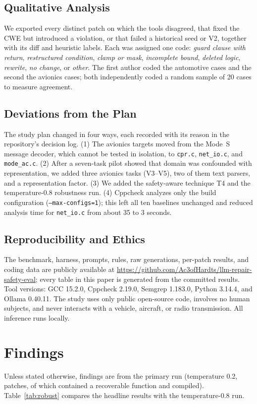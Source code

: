 \documentclass[12pt]{IEEEtran}
\begin{document}
\subsection{Qualitative Analysis}
We exported every distinct patch on which the tools disagreed, that fixed the CWE but introduced a violation, or that failed a historical seed or V2, together with its diff and heuristic labels. Each was assigned one code: \emph{guard clause with return}, \emph{restructured condition}, \emph{clamp or mask}, \emph{incomplete bound}, \emph{deleted logic}, \emph{rewrite}, \emph{no change}, or \emph{other}. The first author coded the automotive cases and the second the avionics cases; both independently coded a random sample of 20 cases to measure agreement.

\subsection{Deviations from the Plan}
The study plan changed in four ways, each recorded with its reason in the repository's decision log. (1) The avionics targets moved from the Mode~S message decoder, which cannot be tested in isolation, to \texttt{cpr.c}, \texttt{net\_io.c}, and \texttt{mode\_ac.c}. (2) After a seven-task pilot showed that domain was confounded with representation, we added three avionics tasks (V3--V5), two of them text parsers, and a representation factor. (3) We added the safety-aware technique T4 and the temperature-0.8 robustness run. (4) Cppcheck analyzes only the build configuration (\texttt{--max-configs=1}); this left all ten baselines unchanged and reduced analysis time for \texttt{net\_io.c} from about 35 to 3 seconds.

\subsection{Reproducibility and Ethics}
The benchmark, harness, prompts, rules, raw generations, per-patch results, and coding data are publicly available at \url{https://github.com/Ac3ofHardts/llm-repair-safety-eval}; every table in this paper is generated from the committed results. Tool versions: GCC 15.2.0, Cppcheck 2.19.0, Semgrep 1.183.0, Python 3.14.4, and Ollama 0.40.11. The study uses only public open-source code, involves no human subjects, and never interacts with a vehicle, aircraft, or radio transmission. All inference runs locally.

\section{Findings}
\label{sec:results}
Unless stated otherwise, findings are from the primary run (temperature 0.2,  patches, of which  contained a recoverable function and  compiled). Table~\ref{tab:robust} compares the headline results with the temperature-0.8 run.
\end{document}
